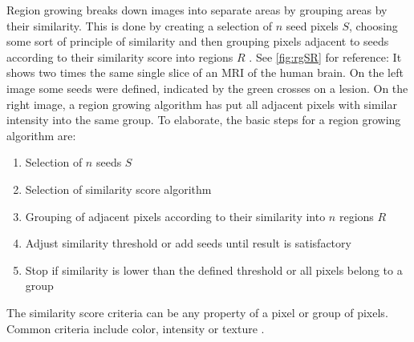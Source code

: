 \noindent
Region growing breaks down images into separate areas by grouping areas by their similarity.
This is done by creating a selection of $n$ seed pixels $S$, choosing some sort of principle of similarity
and then grouping pixels adjacent to seeds according to their similarity score into regions $R$ \cite{jourlinVariousContrastConcepts2016,palReviewImageSegmentation1993}.
See \cref{fig:rgSR} for reference: It shows two times the same single slice of an MRI of the human brain.
On the left image some seeds were defined, indicated by the green crosses on a lesion.
On the right image, a region growing algorithm has put all adjacent pixels with similar intensity into the same group.
To elaborate, the basic steps for a region growing algorithm are:
\begin{enumerate}
	\item Selection of $n$ seeds $S$
	\item Selection of similarity score algorithm
	\item Grouping of adjacent pixels according to their similarity into $n$ regions $R$
	\item Adjust similarity threshold or add seeds until result is satisfactory
	\item Stop if similarity is lower than the defined threshold or all pixels belong to a group
\end{enumerate}
\noindent
The similarity score criteria can be any property of a pixel or group of pixels.
Common criteria include color, intensity or texture \cite{jourlinVariousContrastConcepts2016,palReviewImageSegmentation1993}.
